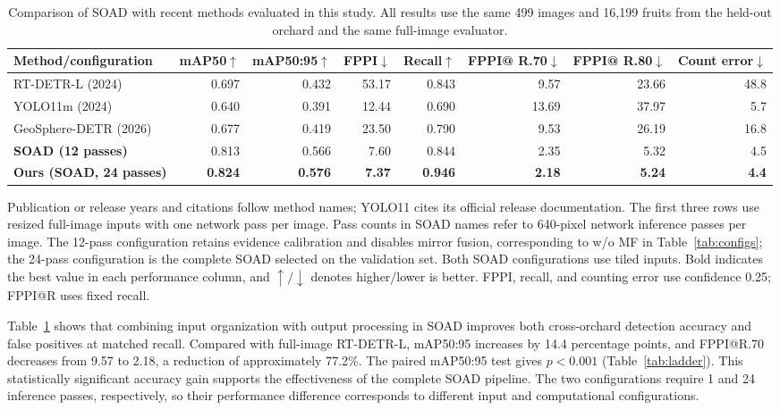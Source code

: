 \documentclass[11pt,a4paper]{article}
\begin{document}
\begin{table}[H]
\centering
\scriptsize\setlength{\tabcolsep}{4pt}
\caption{Comparison of SOAD with recent methods evaluated in this study. All results use the same 499 images and 16,199 fruits from the held-out orchard and the same full-image evaluator.}
\label{tab:main}
\begin{adjustbox}{max width=\linewidth}
\begin{tabular}{lrrrrrrr}
\toprule
Method/configuration & mAP50$\uparrow$ & mAP50:95$\uparrow$ & FPPI$\downarrow$ & Recall$\uparrow$ & \shortstack{FPPI@\\R.70$\downarrow$} & \shortstack{FPPI@\\R.80$\downarrow$} & \shortstack{Count\\error$\downarrow$} \\
\midrule
RT-DETR-L (2024) \cite{rtdetr} & 0.697 & 0.432 & 53.17 & 0.843 & 9.57 & 23.66 & 48.8 \\
YOLO11m (2024) \cite{yolo11} & 0.640 & 0.391 & 12.44 & 0.690 & 13.69 & 37.97 & 5.7 \\
GeoSphere-DETR (2026) \cite{geosphere} & 0.677 & 0.419 & 23.50 & 0.790 & 9.53 & 26.19 & 16.8 \\
\midrule
\textbf{SOAD (12 passes)} & 0.813 & 0.566 & 7.60 & 0.844 & 2.35 & 5.32 & 4.5 \\
\textbf{Ours (SOAD, 24 passes)} & \textbf{0.824} & \textbf{0.576} & \textbf{7.37} & \textbf{0.946} & \textbf{2.18} & \textbf{5.24} & \textbf{4.4} \\
\bottomrule
\end{tabular}
\end{adjustbox}
\par\vspace{2pt}\parbox{0.97\linewidth}{\footnotesize Publication or release years and citations follow method names; YOLO11 cites its official release documentation. The first three rows use resized full-image inputs with one network pass per image. Pass counts in SOAD names refer to 640-pixel network inference passes per image. The 12-pass configuration retains evidence calibration and disables mirror fusion, corresponding to w/o MF in Table~\ref{tab:configs}; the 24-pass configuration is the complete SOAD selected on the validation set. Both SOAD configurations use tiled inputs. Bold indicates the best value in each performance column, and $\uparrow/\downarrow$ denotes higher/lower is better. FPPI, recall, and counting error use confidence 0.25; FPPI@R uses fixed recall.}
\end{table}
Table~\ref{tab:main} shows that combining input organization with output processing in SOAD improves both cross-orchard detection accuracy and false positives at matched recall. Compared with full-image RT-DETR-L, mAP50:95 increases by 14.4 percentage points, and FPPI@R.70 decreases from 9.57 to 2.18, a reduction of approximately 77.2\%. The paired mAP50:95 test gives $p<0.001$ (Table~\ref{tab:ladder}). This statistically significant accuracy gain supports the effectiveness of the complete SOAD pipeline. The two configurations require 1 and 24 inference passes, respectively, so their performance difference corresponds to different input and computational configurations.
\end{document}
